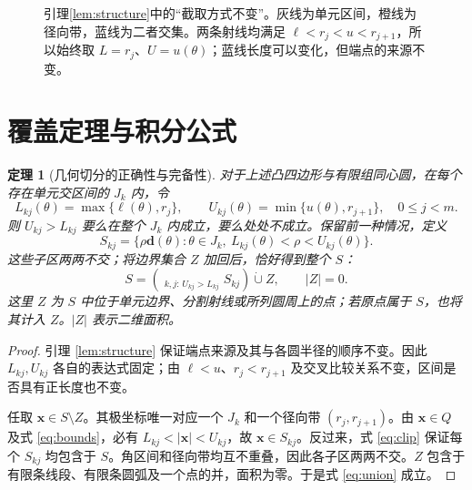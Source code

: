 \documentclass[UTF8,11pt,a4paper,fontset=fandol]{ctexart}
\numberwithin{equation}{section}
\newtheorem{theorem}{定理}[section]
\begin{document}
\begin{figure}[htbp]
\centering
{}
\caption{引理\ref{lem:structure}中的“截取方式不变”。灰线为单元区间，橙线为径向带，蓝线为二者交集。两条射线均满足 $\ell<r_j<u<r_{j+1}$，所以始终取 $L=r_j$、$U=u(\theta)$；蓝线长度可以变化，但端点的来源不变。}
\label{fig:lemma-clip}
\end{figure}

\section{覆盖定理与积分公式}
\begin{theorem}[几何切分的正确性与完备性]\label{thm:complete}
对于上述凸四边形与有限组同心圆，在每个存在单元交区间的 $J_k$ 内，令
\begin{equation}\label{eq:clip}
 L_{kj}(\theta)=\max\{\ell(\theta),r_j\},\qquad
 U_{kj}(\theta)=\min\{u(\theta),r_{j+1}\},\quad 0\leq j<m.
\end{equation}
则 $U_{kj}>L_{kj}$ 要么在整个 $J_k$ 内成立，要么处处不成立。保留前一种情况，定义
\begin{equation}\label{eq:cell}
 S_{kj}=\{\rho \bm{d}(\theta):\theta\in J_k,\ L_{kj}(\theta)<\rho<U_{kj}(\theta)\}.
\end{equation}
这些子区两两不交；将边界集合 $Z$ 加回后，恰好得到整个 $S$：
\begin{equation}\label{eq:union}
 S=\left(\mathop{\dot\bigcup}_{k,j:\,U_{kj}>L_{kj}} S_{kj}\right)\mathbin{\dot\cup}Z,
 \qquad |Z|=0.
\end{equation}
这里 $Z$ 为 $S$ 中位于单元边界、分割射线或所列圆周上的点；若原点属于 $S$，也将其计入 $Z$。$|Z|$ 表示二维面积。
\end{theorem}
\begin{proof}
引理 \ref{lem:structure} 保证端点来源及其与各圆半径的顺序不变。因此 $L_{kj},U_{kj}$ 各自的表达式固定；由 $\ell<u$、$r_j<r_{j+1}$ 及交叉比较关系不变，区间是否具有正长度也不变。

任取 $\bm{x}\in S\setminus Z$。其极坐标唯一对应一个 $J_k$ 和一个径向带 $(r_j,r_{j+1})$。由 $\bm{x}\in Q$ 及式 \eqref{eq:bounds}，必有
$L_{kj}<|\bm{x}|<U_{kj}$，故 $\bm{x}\in S_{kj}$。反过来，式 \eqref{eq:clip} 保证每个 $S_{kj}$ 均包含于 $S$。角区间和径向带均互不重叠，因此各子区两两不交。$Z$ 包含于有限条线段、有限条圆弧及一个点的并，面积为零。于是式 \eqref{eq:union} 成立。
\end{proof}
\end{document}
